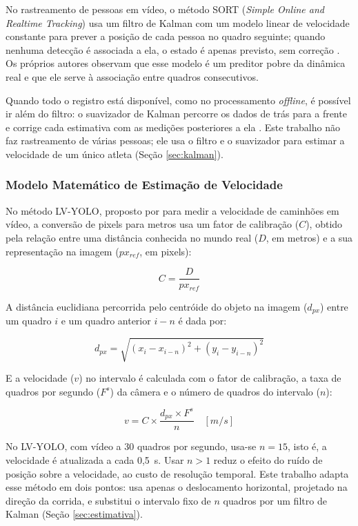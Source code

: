 \documentclass[
    12pt,               %
    openright,          %
    twoside,            %
    a4paper,            %
    chapter=TITLE,      %
    english,            %
    brazil              %
    ]{abntex2}
\begin{document}
No rastreamento de pessoas em vídeo, o método SORT (\textit{Simple Online and Realtime Tracking}) usa um filtro de Kalman com um modelo linear de velocidade constante para prever a posição de cada pessoa no quadro seguinte; quando nenhuma detecção é associada a ela, o estado é apenas previsto, sem correção \cite{bewley2016simple}. Os próprios autores observam que esse modelo é um preditor pobre da dinâmica real e que ele serve à associação entre quadros consecutivos.

Quando todo o registro está disponível, como no processamento \textit{offline}, é possível ir além do filtro: o suavizador de Kalman percorre os dados de trás para a frente e corrige cada estimativa com as medições posteriores a ela \cite{sarkka2023bayesian}. Este trabalho não faz rastreamento de várias pessoas; ele usa o filtro e o suavizador para estimar a velocidade de um único atleta (Seção \ref{sec:kalman}).

\subsubsection{Modelo Matemático de Estimação de Velocidade}
No método LV-YOLO, proposto por  para medir a velocidade de caminhões em vídeo, a conversão de pixels para metros usa um fator de calibração ($C$), obtido pela relação entre uma distância conhecida no mundo real ($D$, em metros) e a sua representação na imagem ($px_{ref}$, em pixels):

\begin{equation} \label{eq:escala}
    C = \frac{D}{px_{ref}}
\end{equation}

A distância euclidiana percorrida pelo centróide do objeto na imagem ($d_{px}$) entre um quadro $i$ e um quadro anterior $i-n$ é dada por:

\begin{equation}
    d_{px} = \sqrt{(x_i - x_{i-n})^2 + (y_i - y_{i-n})^2}
\end{equation}

E a velocidade ($v$) no intervalo é calculada com o fator de calibração, a taxa de quadros por segundo ($F^s$) da câmera e o número de quadros do intervalo ($n$):

\begin{equation}
    v = C \times \frac{d_{px} \times F^s}{n} \quad [m/s]
\end{equation}

No LV-YOLO, com vídeo a 30 quadros por segundo, usa-se $n = 15$, isto é, a velocidade é atualizada a cada 0,5~s. Usar $n > 1$ reduz o efeito do ruído de posição sobre a velocidade, ao custo de resolução temporal. Este trabalho adapta esse método em dois pontos: usa apenas o deslocamento horizontal, projetado na direção da corrida, e substitui o intervalo fixo de $n$ quadros por um filtro de Kalman (Seção \ref{sec:estimativa}).
\end{document}
